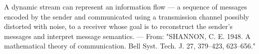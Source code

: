 \documentclass[12pt]{article}
\begin{document}
A dynamic stream can represent an information flow --- a sequence of messages
encoded by the sender and communicated using a transmission channel
possibly distorted with noise, to a receiver whose goal is to reconstruct the
sender's messages and interpret message semantics.
---
From:
"SHANNON, C. E. 1948. A mathematical theory of communication. Bell Syst. Tech. J. 27, 379--423, 623--656."
\end{document}
